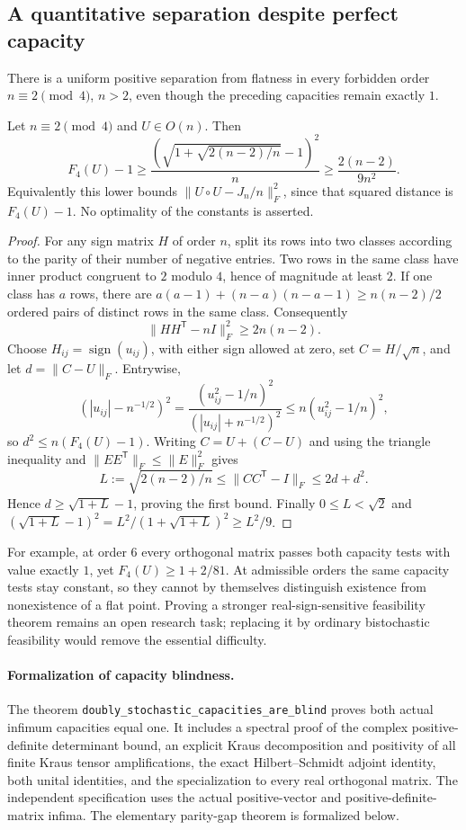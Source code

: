 \subsection{A quantitative separation despite perfect capacity}
There is a uniform positive separation from flatness in every forbidden
order $n\equiv2\pmod4$, $n>2$, even though the preceding capacities
remain exactly $1$.

\begin{proposition}
Let $n\equiv2\pmod4$ and $U\in O(n)$. Then
\[
 F_4(U)-1\ge
 \frac{\left(\sqrt{1+\sqrt{2(n-2)/n}}-1\right)^2}{n}
 \ge \frac{2(n-2)}{9n^2}.
\]
Equivalently this lower bounds
$\|U\circ U-J_n/n\|_F^2$, since that squared distance is $F_4(U)-1$.
No optimality of the constants is asserted.
\end{proposition}
\begin{proof}
For any sign matrix $H$ of order $n$, split its rows into two classes
according to the parity of their number of negative entries.
Two rows in the same class have inner product congruent to $2$
modulo $4$, hence of magnitude at least $2$. If one class has $a$
rows, there are $a(a-1)+(n-a)(n-a-1)\ge n(n-2)/2$ ordered pairs of
distinct rows in the same class. Consequently
\[
 \|HH^{\mathsf T}-nI\|_F^2\ge2n(n-2).
\]
Choose $H_{ij}=\operatorname{sign}(u_{ij})$, with either sign allowed
at zero, set $C=H/\sqrt n$, and let $d=\|C-U\|_F$.
Entrywise,
\[
 \left(|u_{ij}|-n^{-1/2}\right)^2
 =\frac{(u_{ij}^2-1/n)^2}{(|u_{ij}|+n^{-1/2})^2}
 \le n(u_{ij}^2-1/n)^2,
\]
so $d^2\le n(F_4(U)-1)$. Writing $C=U+(C-U)$ and using the
triangle inequality and $\|EE^{\mathsf T}\|_F\le\|E\|_F^2$ gives
\[
 L:=\sqrt{2(n-2)/n}\le\|CC^{\mathsf T}-I\|_F\le2d+d^2.
\]
Hence $d\ge\sqrt{1+L}-1$, proving the first bound.
Finally $0\le L<\sqrt2$ and
$(\sqrt{1+L}-1)^2=L^2/(1+\sqrt{1+L})^2\ge L^2/9$.
\end{proof}

For example, at order $6$ every orthogonal matrix passes both capacity
tests with value exactly $1$, yet $F_4(U)\ge1+2/81$.
At admissible orders the same capacity tests stay constant, so they
cannot by themselves distinguish existence from nonexistence of a flat
point. Proving a stronger real-sign-sensitive feasibility theorem remains
an open research task; replacing it by ordinary bistochastic feasibility
would remove the essential difficulty.


\paragraph{Formalization of capacity blindness.} The theorem \texttt{doubly\_\allowbreak stochastic\_\allowbreak capacities\_\allowbreak are\_\allowbreak blind} proves both actual infimum capacities equal one. It includes a spectral proof of the complex positive-definite determinant bound, an explicit Kraus decomposition and positivity of all finite Kraus tensor amplifications, the exact Hilbert--Schmidt adjoint identity, both unital identities, and the specialization to every real orthogonal matrix. The independent specification uses the actual positive-vector and positive-definite-matrix infima. The elementary parity-gap theorem is formalized below.

